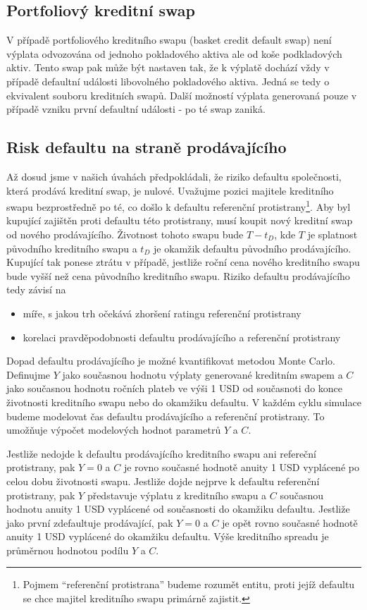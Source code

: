 \documentclass[a4paper]{book}
\begin{document}
\subsection{Portfoliový kreditní swap}

V případě portfoliového kreditního swapu (basket credit default swap) není výplata odvozována od jednoho pokladového aktiva ale od koše podkladových aktiv. Tento swap pak může být nastaven tak, že k výplatě dochází vždy v případě defaultní události libovolného pokladového aktiva. Jedná se tedy o ekvivalent souboru kreditních swapů. Další možností výplata generovaná pouze v případě vzniku první defaultní události - po té swap zaniká.

\subsection{Risk defaultu na straně prodávajícího}

Až dosud jsme v našich úvahách předpokládali, že riziko defaultu společnosti, která prodává kreditní swap, je nulové. Uvažujme pozici majitele kreditního swapu bezprostředně po té, co došlo k defaultu referenční protistrany\footnote{Pojmem ``referenční protistrana'' budeme rozumět entitu, proti jejíž defaultu se chce majitel kreditního swapu primárně zajistit.}. Aby byl kupující zajištěn proti defaultu této protistrany, musí koupit nový kreditní swap od nového prodávajícího. Životnost tohoto swapu bude $T - t_D$, kde $T$ je splatnost původního kreditního swapu a $t_D$ je okamžik defaultu původního prodávajícího. Kupující tak ponese ztrátu v případě, jestliže roční cena nového kreditního swapu bude vyšší než cena původního kreditního swapu. Riziko defaultu prodávajícího tedy závisí na
\begin{itemize}
\item míře, s jakou trh očekává zhoršení ratingu referenční protistrany
\item korelaci pravděpodobnosti defaultu prodávajícího a referenční protistrany
\end{itemize} 
Dopad defaultu prodávajícího je možné kvantifikovat metodou Monte Carlo. Definujme $Y$ jako současnou hodnotu výplaty generované kreditním swapem a $C$ jako současnou hodnotu ročních plateb ve výši 1 USD od současnoti do konce životnosti kreditního swapu nebo do okamžiku defaultu. V každém cyklu simulace budeme modelovat čas defaultu prodávajícího a referenční protistrany. To umožňuje výpočet modelových hodnot parametrů $Y$ a $C$.

Jestliže nedojde k defaultu prodávajícího kreditního swapu ani refereční protistrany, pak $Y = 0$ a $C$ je rovno současné hodnotě anuity 1 USD vyplácené po celou dobu životnosti swapu. Jestliže dojde nejprve k defaultu referenční protistrany, pak $Y$ představuje výplatu z kreditního swapu a $C$ současnou hodnotu anuity 1 USD vyplácené od současnosti do okamžiku defaultu. Jestliže jako první zdefaultuje prodávající, pak $Y=0$ a $C$ je opět rovno současné hodnotě anuity 1 USD vyplácené do okamžiku defaultu. Výše kreditního spreadu je průměrnou hodnotou podílu $Y$ a $C$.
\end{document}
